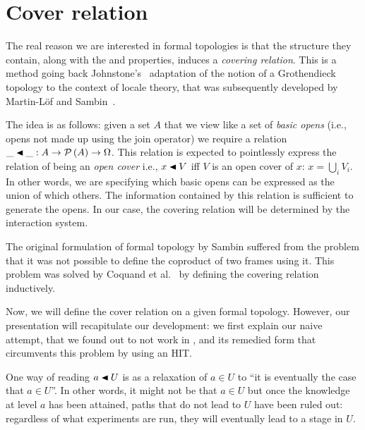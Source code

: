 \section{Cover relation}

The real reason we are interested in formal topologies is that the structure they contain,
along with the \vermono{} and \versim{} properties, induces a \emph{covering relation}.
This is a method going back Johnstone's~\cite{stone-spaces} adaptation of the notion of a
Grothendieck topology to the context of locale theory, that was subsequently developed by
Martin-L\"{o}f and Sambin~\cite{int-formal-spaces}.

The idea is as follows: given a set $A$ that we view like a set of \emph{basic opens}
(i.e., opens not made up using the join operator) we require a relation $\_\covernm{}\_ : A \rightarrow
\pow{A} \rightarrow \Omega$. This relation is expected to pointlessly express the relation of being an
\emph{open cover} i.e., $x \covernm{} V$ iff $V$ is an open cover of $x$: $x = \bigcup_i V_i$. In
other words, we are specifying which basic opens can be expressed as the union of which
others. The information contained by this relation is sufficient to generate the opens.
In our case, the covering relation will be determined by the interaction system.

The original formulation of formal topology by Sambin suffered from the problem that it
was not possible to define the coproduct of two frames using it. This problem was solved
by Coquand et al.~\cite{coq-sambin} by defining the covering relation inductively.

Now, we will define the cover relation on a given formal topology. However, our
presentation will recapitulate our development: we first explain our naive attempt, that
we found out to not work in \UF{}, and its remedied form that circumvents this problem by
using an HIT.
\begin{defn}[Foo]
\end{defn}

One way of reading $\covers{a}{U}$ is as a relaxation of $a \in U$ to ``it is eventually the
case that $a \in U$''. In other words, it might not be that $a \in U$ but once the knowledge
at level $a$ has been attained, paths that do not lead to $U$ have been ruled out:
regardless of what experiments are run, they will eventually lead to a stage in $U$.

